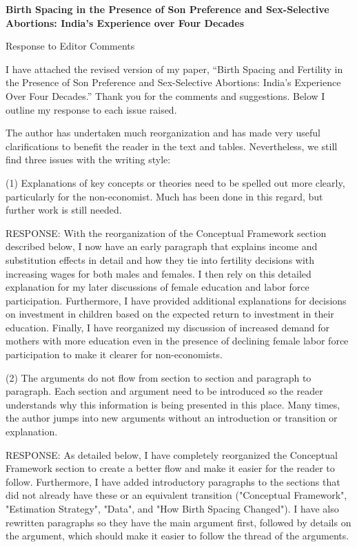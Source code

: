 \documentclass[letterpaper,12pt]{article}
\title{} \author{}
\begin{document}
\begin{center} \textbf{\large Birth Spacing in the Presence of Son
Preference and 
Sex-Selective Abortions: India's Experience over Four Decades}
\end{center}

\begin{center} Response to Editor Comments \end{center}

\noindent I have attached the revised version of my paper,
``Birth Spacing and Fertility in the Presence of Son Preference and Sex-Selective
Abortions: India's Experience Over Four Decades.''
Thank you for the comments and suggestions. 
Below I outline my response to each issue raised.


The author has undertaken much reorganization and has made very useful clarifications to
benefit the reader in the text and tables. Nevertheless, we still find three issues with
the writing style:

(1) Explanations of key concepts or theories need to be spelled out more clearly,
particularly for the non-economist. Much has been done in this regard, but further work is
still needed.

RESPONSE: With the reorganization of the Conceptual Framework section described below, I now 
have an early paragraph that explains income and substitution effects in detail and how they 
tie into fertility decisions with increasing wages for both males and females.
I then rely on this detailed explanation for my later discussions of female education and
labor force participation.
Furthermore, I have provided additional explanations for decisions on investment in children 
based on the expected return to investment in their education.
Finally, I have reorganized my discussion of increased demand for mothers with more education
even in the presence of declining female labor force participation to make it clearer for
non-economists.


(2) The arguments do not flow from section to section and paragraph to paragraph. Each
section and argument need to be introduced so the reader understands why this information
is being presented in this place. Many times, the author jumps into new arguments without
an introduction or transition or explanation.

RESPONSE: As detailed below, I have completely reorganized the Conceptual Framework section
to create a better flow and make it easier for the reader to follow.
Furthermore, I have added introductory paragraphs to the sections that did not already 
have these or an equivalent transition ("Conceptual Framework", "Estimation Strategy", "Data", 
and "How Birth Spacing Changed").
I have also rewritten paragraphs so they have the main argument first, followed by details
on the argument, which should make it easier to follow the thread of the arguments.
\end{document}

